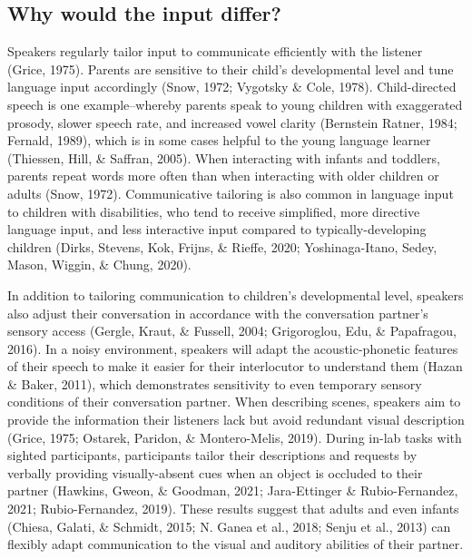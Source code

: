 \documentclass[
  man]{apa6}
\begin{document}
\hypertarget{why-would-the-input-differ}{%
\subsection{Why would the input differ?}\label{why-would-the-input-differ}}

Speakers regularly tailor input to communicate efficiently with the listener (Grice, 1975). Parents are sensitive to their child's developmental level and tune language input accordingly (Snow, 1972; Vygotsky \& Cole, 1978). Child-directed speech is one example--whereby parents speak to young children with exaggerated prosody, slower speech rate, and increased vowel clarity (Bernstein Ratner, 1984; Fernald, 1989), which is in some cases helpful to the young language learner (Thiessen, Hill, \& Saffran, 2005). When interacting with infants and toddlers, parents repeat words more often than when interacting with older children or adults (Snow, 1972). Communicative tailoring is also common in language input to children with disabilities, who tend to receive simplified, more directive language input, and less interactive input compared to typically-developing children (Dirks, Stevens, Kok, Frijns, \& Rieffe, 2020; Yoshinaga-Itano, Sedey, Mason, Wiggin, \& Chung, 2020).

In addition to tailoring communication to children's developmental level, speakers also adjust their conversation in accordance with the conversation partner's sensory access (Gergle, Kraut, \& Fussell, 2004; Grigoroglou, Edu, \& Papafragou, 2016). In a noisy environment, speakers will adapt the acoustic-phonetic features of their speech to make it easier for their interlocutor to understand them (Hazan \& Baker, 2011), which demonstrates sensitivity to even temporary sensory conditions of their conversation partner. When describing scenes, speakers aim to provide the information their listeners lack but avoid redundant visual description (Grice, 1975; Ostarek, Paridon, \& Montero-Melis, 2019). During in-lab tasks with sighted participants, participants tailor their descriptions and requests by verbally providing visually-absent cues when an object is occluded to their partner (Hawkins, Gweon, \& Goodman, 2021; Jara-Ettinger \& Rubio-Fernandez, 2021; Rubio-Fernandez, 2019). These results suggest that adults and even infants (Chiesa, Galati, \& Schmidt, 2015; N. Ganea et al., 2018; Senju et al., 2013) can flexibly adapt communication to the visual and auditory abilities of their partner.
\end{document}
